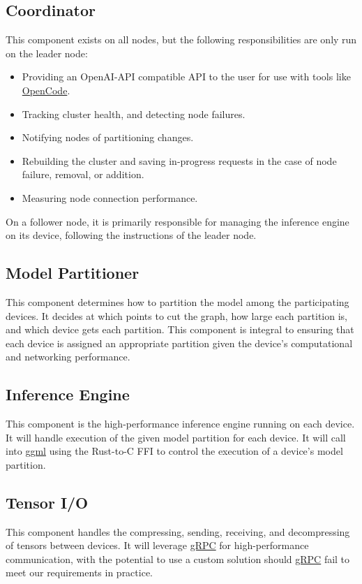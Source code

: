 \documentclass{article}
\begin{document}
\subsection{Coordinator}
\label{subsec:coordinator}
This component exists on all nodes, but the following responsibilities are only run on the leader node:
\begin{itemize}
	\item Providing an OpenAI-API compatible API to the user for use with tools like
		\href{https://opencode.ai/}{OpenCode}.
	\item Tracking cluster health, and detecting node failures.
	\item Notifying nodes of partitioning changes.
	\item Rebuilding the cluster and saving in-progress requests
		in the case of node failure, removal, or addition.
	\item Measuring node connection performance.
\end{itemize}
On a follower node, it is primarily responsible for managing the inference engine
on its device, following the instructions of the leader node.

\subsection{Model Partitioner}
This component determines how to partition the model among the participating devices. It
decides at which points to cut the graph, how large each partition is, and which device gets
each partition. This component is integral to ensuring that each device is assigned an appropriate
partition given the device's computational and networking performance.

\subsection{Inference Engine}
This component is the high-performance inference engine running on each device. It will handle
execution of the given model partition for each device. It will call into
\href{https://github.com/ggml-org/ggml}{ggml} using the Rust-to-C FFI to control the execution of a
device's model partition.

\subsection{Tensor I/O}
This component handles the compressing, sending, receiving, and decompressing of tensors between devices.
It will leverage \href{https://grpc.io/}{gRPC} for high-performance communication, with the potential
to use a custom solution should \href{https://grpc.io/}{gRPC} fail to meet our requirements in practice.
\end{document}
